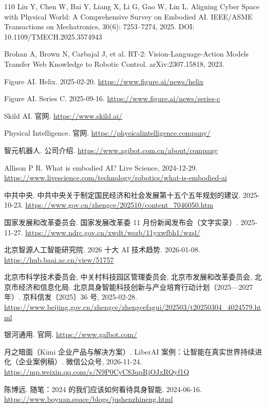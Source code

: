 \documentclass[10pt,fontset=fandol]{ctexart}
\begin{document}
\begin{thebibliography}{110}
Liu Y, Chen W, Bai Y, Liang X, Li G, Gao W, Lin L. Aligning Cyber Space with Physical World: A Comprehensive Survey on Embodied AI. IEEE/ASME Transactions on Mechatronics, 30(6): 7253–7274, 2025. DOI: 10.1109/TMECH.2025.3574943

Brohan A, Brown N, Carbajal J, et al. RT-2: Vision-Language-Action Models Transfer Web Knowledge to Robotic Control. arXiv:2307.15818, 2023.

Figure AI. Helix. 2025-02-20. \url{https://www.figure.ai/news/helix}

Figure AI. Series C. 2025-09-16. \url{https://www.figure.ai/news/series-c}

Skild AI. 官网. \url{https://www.skild.ai/}

Physical Intelligence. 官网. \url{https://physicalintelligence.company/}

智元机器人. 公司介绍. \url{https://www.agibot.com.cn/about/company}

Allison P R. What is embodied AI? Live Science, 2024-12-29. \url{https://www.livescience.com/technology/robotics/what-is-embodied-ai}

中共中央. 中共中央关于制定国民经济和社会发展第十五个五年规划的建议. 2025-10-23. \url{https://www.gov.cn/zhengce/202510/content\_7046050.htm}

国家发展和改革委员会. 国家发展改革委 11 月份新闻发布会（文字实录）. 2025-11-27. \url{https://www.ndrc.gov.cn/xwdt/wszb/11yxwfbh1/wzsl/}

北京智源人工智能研究院. 2026 十大 AI 技术趋势. 2026-01-08. \url{https://hub.baai.ac.cn/view/51757}

北京市科学技术委员会, 中关村科技园区管理委员会, 北京市发展和改革委员会, 北京市经济和信息化局. 北京具身智能科技创新与产业培育行动计划（2025—2027 年）. 京科信发〔2025〕36 号, 2025-02-28. \url{https://www.beijing.gov.cn/zhengce/zhengcefagui/202503/t20250304\_4024579.html}

银河通用. 官网. \url{https://www.galbot.com/}

月之暗面（Kimi 企业产品与解决方案）. LiberAI 案例：让智能在真实世界持续进化（企业案例稿）. 微信公众号, 2026-11-24. \url{https://mp.weixin.qq.com/s/N9P0CyC83upRjOJxRQyf1Q}

陈博远. 随笔：2024 的我们应该如何看待具身智能. 2024-06-16. \url{https://www.boyuan.space/blogs/jushenzhineng.html}


\end{thebibliography}
\end{document}
